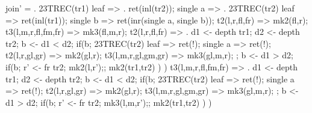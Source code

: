 join' = .
  23TREC(tr1){
    leaf => . ret(inl(tr2));
    single a => .
      23TREC(tr2){
        leaf => ret(inl(tr1));
        single b => ret(inr(single a, single b));
        t2(l,r,fl,fr) => mk2(fl,r);
        t3(l,m,r,fl,fm,fr) => mk3(fl,m,r);
      }
    t2(l,r,fl,fr) => .
      d1 <- depth tr1;
      d2 <- depth tr2;
      b <- d1 < d2;
      if(b;
        23TREC(tr2){
         leaf => ret(!);
         single a => ret(!);
         t2(l,r,gl,gr) => mk2(gl,r);
         t3(l,m,r,gl,gm,gr) => mk3(gl,m,r);
        };
        b <- d1 > d2;
        if(b;
          r' <- fr tr2;
          mk2(l,r');;
          mk2(tr1,tr2)
        )
      )
    t3(l,m,r,fl,fm,fr) => .
      d1 <- depth tr1;
      d2 <- depth tr2;
      b <- d1 < d2;
      if(b;
        23TREC(tr2){
         leaf => ret(!);
         single a => ret(!);
         t2(l,r,gl,gr) => mk2(gl,r);
         t3(l,m,r,gl,gm,gr) => mk3(gl,m,r);
        };
        b <- d1 > d2;
        if(b;
          r' <- fr tr2;
          mk3(l,m,r');;
          mk2(tr1,tr2)
        )
      )
  }
\fi

\iffalse
  \left
  \mathsf{full\_left} \triangleq 
    \lam{t}{\_}{
      \lam{n}{\_}{
      \ttrec{t}{\const{\zero}}{\_}{\const{\zero}}
        {\_,\_,s_l,d_l,\_,\_,f_l,\_}\\{
          \bind{d_l+1}{d}{\bind{\eq\;n\;d}{b}{\ifnat{b}{\ret{b}}{\ret{f_l}}}}}\\
        {\_,\_,\_,s_l,d_l,\_,\_,\_,\_,f_l,\_,\_}{
          \bind{d_l+1}{d}{\bind{\eq\;n\;d}{b}{\ifnat{b}{\ret{\zero}}{\ret{f_l}}}}}
        }
        }\\
  \mathsf{full\_right} \triangleq 
    \lam{t}{}{
      \ttrec{t}{\const{\zero}}{\_}{\const{\zero}}
        {\_}{\lam{n}{\_}{\eq\;n\;d}}
          {\_,\_,f_l,f_r}{\bind{n-1}{n'}{f_r\; n'}}
        }\\
\join \triangleq 
  \lam{t_1}{\tttree{A}{s_1}{d_1}}{
    \lam{t_2}{\tttree{A}{s_2}{d_2}}{
    }}
\fi
